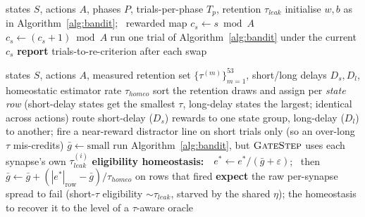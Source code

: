 \begin{algorithm}[htbp!]
\caption{Reversal learning (Figure~\ref{fig:8b}).}
\label{alg:reversal}
\begin{algorithmic}[1]
\Require states $S$, actions $A$, phases $P$, trials-per-phase $T_p$, retention $\tau_{leak}$
\State initialise $w, b$ as in Algorithm~\ref{alg:bandit}; \ rewarded map $c_s \gets s \bmod A$
     \ $c_s \gets (c_s + 1) \bmod A$ \quad{}
    \EndIf
     run one trial of Algorithm~\ref{alg:bandit} under the current $c_s$
    \EndFor
\EndFor
\State \textbf{report} trials-to-re-criterion after each swap
\end{algorithmic}
\end{algorithm}

\begin{algorithm}[htbp!]
\caption{Multi-timescale credit from the measured retention spread (Figure~\ref{fig:8c}).}
\label{alg:multitau}
\begin{algorithmic}[1]
\Require states $S$, actions $A$, measured retention set $\{\tau^{(m)}\}_{m=1}^{53}$, short/long delays $D_s, D_l$, homeostatic estimator rate $\tau_{homeo}$
\State sort the retention draws and assign per \emph{state row} (short-delay states get the smallest $\tau$, long-delay states the largest; identical across actions)
\State route short-delay ($D_s$) rewards to one state group, long-delay ($D_l$) to another; fire a near-reward distractor line on short trials only (so an over-long $\tau$ mis-credits)
\State $\bar g \gets \text{small}$ 
    \State run Algorithm~\ref{alg:bandit}, but $\textsc{GateStep}$ uses each synapse's own $\tau_{leak}^{(i)}$
    \State \textbf{eligibility homeostasis:}\ \ $e^{\ast} \gets e^{\ast}/(\bar g + \varepsilon)$; \ then $\bar g \gets \bar g + (|e^{\ast}|_{\text{row}} - \bar g)/\tau_{homeo}$ on rows that fired 
\EndFor
\State \textbf{expect} the raw per-synapse spread to fail (short-$\tau$ eligibility $\sim\tau_{leak}$, starved by the shared $\eta$); the homeostasis to recover it to the level of a $\tau$-aware oracle
\end{algorithmic}
\end{algorithm}

